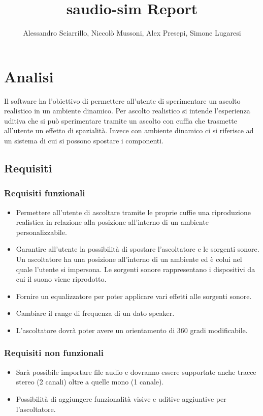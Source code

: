 \documentclass[a4paper,12pt]{report}
\title{saudio-sim Report}
\author{Alessandro Sciarrillo, Niccolò Mussoni, Alex Presepi, Simone Lugaresi}
\begin{document}
\maketitle

\tableofcontents
\chapter{Analisi}
Il software ha l'obiettivo di permettere all'utente di sperimentare un ascolto realistico in un ambiente dinamico.
%
Per ascolto realistico si intende l'esperienza uditiva che si può sperimentare tramite un ascolto con cuffia che trasmette all'utente un effetto di spazialità.
%
Invece con ambiente dinamico ci si riferisce ad un sistema di cui si possono spostare i componenti.

\section{Requisiti}
\subsection*{Requisiti funzionali}
\begin{itemize}
	\item  Permettere all'utente di ascoltare tramite le proprie cuffie una riproduzione realistica in relazione alla posizione all'interno di un ambiente personalizzabile.
	\item Garantire all'utente la possibilità di spostare l'ascoltatore e le sorgenti sonore.
		Un ascoltatore ha una posizione all'interno di un ambiente ed è colui nel quale l'utente si impersona.
		Le sorgenti sonore rappresentano i dispositivi da cui il suono viene riprodotto. 
	\item Fornire un equalizzatore per poter applicare vari effetti alle sorgenti sonore.
	\item Cambiare il range di frequenza di un dato speaker.
	\item L'ascoltatore dovrà poter avere un orientamento di 360 gradi modificabile.
\end{itemize}
%
\subsection*{Requisiti non funzionali}
\begin{itemize}
	\item Sarà possibile importare file audio e dovranno essere supportate anche tracce stereo (2 canali) oltre a quelle mono (1 canale).
	\item Possibilità di aggiungere funzionalità visive e uditive aggiuntive per l'ascoltatore.
\end{itemize}
%
\end{document}
